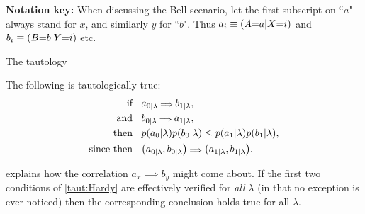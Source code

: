 \textbf{Notation key:} When discussing the Bell scenario, let the first subscript on ``$a$" always stand for $x$, and similarly $y$ for ``$b$". Thus ${a_i \equiv \parens*{A\cramp{=}a|X\cramp{=}i}}$ and ${b_i \equiv \parens*{B\cramp{=}b|Y\cramp{=}i}}$ etc.




The tautology
\begin{taut}\label{taut:Hardy}The following is tautologically true:
\begin{align*}
\text{if }&\;\; a_{0|\lambda} {\scriptstyle \implies} b_{1|\lambda},\\
\text{and }&\;\; b_{0|\lambda} {\scriptstyle \implies} a_{1|\lambda},\\
\text{then }&\;\; \p{a_0|\lambda}\p{b_0|\lambda}\leq\p{a_1|\lambda}\p{b_1|\lambda},\\
\text{since then }&\;\; \parens*{a_{0|\lambda} , b_{0|\lambda}} {\scriptstyle \implies} \parens*{a_{1|\lambda} , b_{1|\lambda}}.
\end{align*}
\end{taut}
\noindent explains how the correlation $a_x {\scriptstyle \implies} b_y$ might come about. If the first two conditions of  \cref{taut:Hardy} are effectively verified for \emph{all} $\lambda$ (in that no exception is ever noticed) then the corresponding conclusion holds true for all $\lambda$. 

